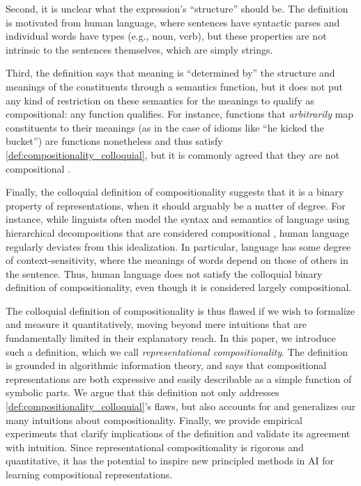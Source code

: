 \documentclass{article} %
\newcommand{\comp}{representational compositionality}
\begin{document}
Second, it is unclear what the expression's ``structure'' should be. The definition is motivated from human language, where sentences have syntactic parses and individual words have types (e.g., noun, verb), but these properties are not intrinsic to the sentences themselves, which are simply strings.

Third, the definition says that meaning is ``determined by'' the structure and meanings of the constituents through a semantics function, but it does not put any kind of restriction on these semantics for the meanings to qualify as compositional: any function qualifies. For instance, functions that \emph{arbitrarily} map constituents to their meanings (as in the case of idioms like ``he kicked the bucket'') are functions nonetheless and thus satisfy \cref{def:compositionality_colloquial}, but it is commonly agreed that they are not compositional \citep{weinreich1969problems,mabruroh2015analysis,swinney1979access}.

Finally, the colloquial definition of compositionality suggests that it is a binary property of representations, when it should arguably be a matter of degree. For instance, while linguists often model the syntax and semantics of language using hierarchical decompositions that are considered compositional \citep{chomsky1956three}, human language regularly deviates from this idealization. In particular, language has some degree of context-sensitivity, where the meanings of words depend on those of others in the sentence. Thus, human language does not satisfy the colloquial binary definition of compositionality, even though it is considered largely compositional.

The colloquial definition of compositionality is thus flawed if we wish to formalize and measure it quantitatively, moving beyond mere intuitions that are fundamentally limited in their explanatory reach. In this paper, we introduce such a definition, which we call \textit{\comp{}}. The definition is grounded in algorithmic information theory, and says that compositional representations are both expressive and easily describable as a simple function of symbolic parts. We argue that this definition not only addresses \cref{def:compositionality_colloquial}'s flaws, but also accounts for and generalizes our many intuitions about compositionality. Finally, we provide empirical experiments that clarify implications of the definition and validate its agreement with intuition. Since \comp{} is rigorous and quantitative, it has the potential to inspire new principled methods in AI for learning compositional representations.
\end{document}
